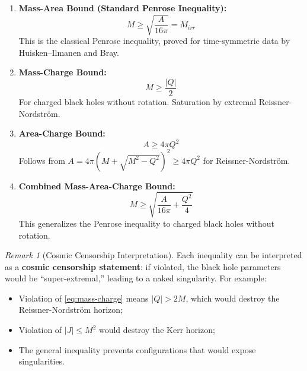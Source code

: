 \documentclass[12pt]{article}
\theoremstyle{plain}
\theoremstyle{definition}
\theoremstyle{remark}
\newtheorem{remark}[theorem]{Remark}
\begin{document}
\begin{enumerate}[label=(\Roman*)]
    \item \textbf{Mass-Area Bound (Standard Penrose Inequality):}
    \begin{equation}\label{eq:mass-area}
    M \geq \sqrt{\frac{A}{16\pi}} = M_{irr}
    \end{equation}
    This is the classical Penrose inequality, proved for time-symmetric data by Huisken--Ilmanen and Bray.
    
    \item \textbf{Mass-Charge Bound:}
    \begin{equation}\label{eq:mass-charge}
    M \geq \frac{|Q|}{2}
    \end{equation}
    For charged black holes without rotation. Saturation by extremal Reissner-Nordstr\"om.
    
    \item \textbf{Area-Charge Bound:}
    \begin{equation}\label{eq:area-charge}
    A \geq 4\pi Q^2
    \end{equation}
    Follows from $A = 4\pi(M + \sqrt{M^2 - Q^2})^2 \geq 4\pi Q^2$ for Reissner-Nordstr\"om.
    
    \item \textbf{Combined Mass-Area-Charge Bound:}
    \begin{equation}\label{eq:mass-area-charge}
    M \geq \sqrt{\frac{A}{16\pi} + \frac{Q^2}{4}}
    \end{equation}
    This generalizes the Penrose inequality to charged black holes without rotation.
\end{enumerate}

\begin{remark}[Cosmic Censorship Interpretation]
Each inequality can be interpreted as a \textbf{cosmic censorship statement}: if violated, the black hole parameters would be ``super-extremal,'' leading to a naked singularity. For example:
\begin{itemize}
    \item Violation of \eqref{eq:mass-charge} means $|Q| > 2M$, which would destroy the Reissner-Nordstr\"om horizon;
    \item Violation of $|J| \leq M^2$ would destroy the Kerr horizon;
    \item The general inequality prevents configurations that would expose singularities.
\end{itemize}
\end{remark}
\end{document}
